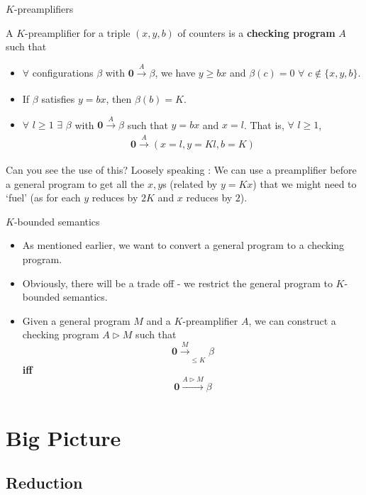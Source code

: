 \documentclass{beamer}
\renewcommand{\r}[1]{\text{\rmfamily{\textbf{#1}}}}
\renewcommand{\b}[1]{\boldsymbol{#1}}
\newcommand{\zero}[0]{\b{0}}
\newcommand{\prog}[1]{\xrightarrow[]{#1}}
\begin{document}
\begin{frame}{$K$-preamplifiers}

A $K$-preamplifier for a triple $(x,y,b)$ of counters is a \textbf{checking program} $A$ such that 
\begin{itemize}
    \item $\forall$ configurations $\beta$ with $\zero \prog{A} \beta$, we have $y \geq bx$ and $\beta(c) = 0$ $\forall$ $c \notin \{x,y,b\}$.
    \item If $\beta$ satisfies $y = bx$, then $\beta(b) = K$.
    \item $\forall$ $l \geq 1$ $\exists$ $\beta$ with $\zero \prog{A} \beta$ such that $y = bx$ and $x = l$. That is, $\forall$ $l \geq 1$,
    $$\zero \prog{A} (x = l, y = Kl, b = K)$$
\end{itemize}
\pause
Can you see the use of this? Loosely speaking : We can use a preamplifier before a general program to get all the $x,y$s (related by $y = Kx$) that we might need to `fuel' \r{simtest} (as for each \r{simtest} $y$ reduces by $2K$ and $x$ reduces by $2$).
    
\end{frame}


\begin{frame}{$K$-bounded semantics}

    \begin{itemize}
        \item As mentioned earlier, we want to convert a general program to a checking program. 
        \item Obviously, there will be a trade off - we restrict the general program to $K$-bounded semantics.
        \pause
        \item Given a general program $M$ and a $K$-preamplifier $A$, we can construct a checking program $A\triangleright M$ such that 
        $$\zero \prog{M}_{\leq K} \beta $$ \textbf{iff}
        $$\zero \prog{A\triangleright M} \beta$$
    \end{itemize}
    
\end{frame}

\section{Big Picture}

 \subsection{Reduction}
 
\end{document}
